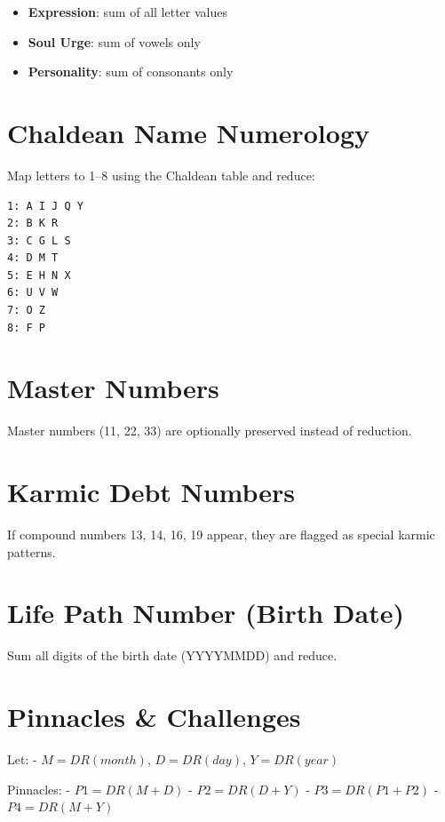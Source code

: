 \documentclass[
  11pt,
  a4paper,
  oneside,
  openany]{report}
\providecommand{\tightlist}{%
  \setlength{\itemsep}{0pt}\setlength{\parskip}{0pt}}\usepackage{longtable,booktabs,array}
\begin{document}
\begin{itemize}
\tightlist
\item
  \textbf{Expression}: sum of all letter values
\item
  \textbf{Soul Urge}: sum of vowels only
\item
  \textbf{Personality}: sum of consonants only
\end{itemize}

\section{Chaldean Name Numerology}\label{chaldean-name-numerology}

Map letters to 1--8 using the Chaldean table and reduce:

\begin{verbatim}
1: A I J Q Y
2: B K R
3: C G L S
4: D M T
5: E H N X
6: U V W
7: O Z
8: F P
\end{verbatim}

\section{Master Numbers}\label{master-numbers}

Master numbers (11, 22, 33) are optionally preserved instead of
reduction.

\section{Karmic Debt Numbers}\label{karmic-debt-numbers}

If compound numbers 13, 14, 16, 19 appear, they are flagged as special
karmic patterns.

\section{Life Path Number (Birth
Date)}\label{life-path-number-birth-date}

Sum all digits of the birth date (YYYYMMDD) and reduce.

\section{Pinnacles \& Challenges}\label{pinnacles-challenges}

Let: - \(M = DR(month)\), \(D = DR(day)\), \(Y = DR(year)\)

Pinnacles: - \(P1 = DR(M + D)\) - \(P2 = DR(D + Y)\) -
\(P3 = DR(P1 + P2)\) - \(P4 = DR(M + Y)\)
\end{document}
